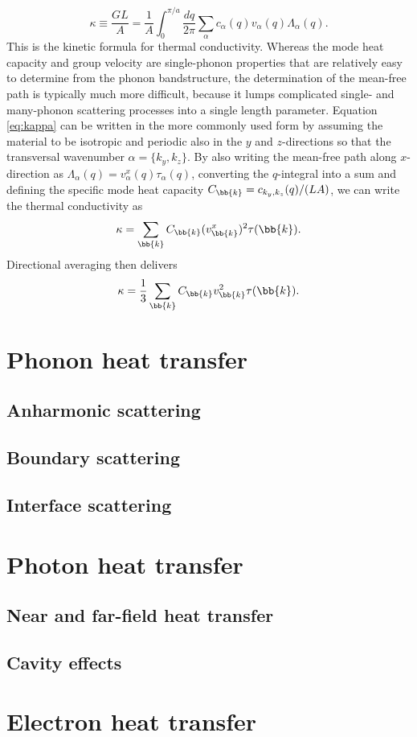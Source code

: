 \begin{equation}
 \kappa \equiv \frac{GL}{A} = \frac{1}{A} \int_0^{\pi/a} \frac{dq}{2\pi} \sum_{\alpha} c_{\alpha}(q) v_{\alpha}(q) \Lambda_{\alpha}(q). \label{eq:kappa}
\end{equation}
This is the kinetic formula for thermal conductivity. Whereas the mode heat capacity and group velocity are single-phonon properties that are relatively easy to determine from the phonon bandstructure, the determination of the mean-free path is typically much more difficult, because it lumps complicated single- and many-phonon scattering processes into a single length parameter. Equation \eqref{eq:kappa} can be written in the more commonly used form by assuming the material to be isotropic and periodic also in the $y$ and $z$-directions so that the transversal wavenumber $\alpha=\{k_y,k_z\}$. By also writing the mean-free path along $x$-direction as $\Lambda_{\alpha}(q)=v^x_{\alpha}(q) \tau_{\alpha}(q)$, converting the $q$-integral into a sum and defining the specific mode heat capacity $C_{\bb{k}}=c_{k_y,k_z}(q)/(LA)$, we can write the thermal conductivity as
\begin{equation}
 \kappa =  \sum_{\bb{k}} C_{\bb{k}} (v^x_{\bb{k}})^2 \tau(\bb{k}) .
\end{equation}
Directional averaging then delivers 
\begin{equation}
 \kappa =  \frac{1}{3} \sum_{\bb{k}} C_{\bb{k}} v_{\bb{k}}^2 \tau(\bb{k}).
\end{equation}



\section{Phonon heat transfer}

\subsection{Anharmonic scattering}

\subsection{Boundary scattering}

\subsection{Interface scattering}



\section{Photon heat transfer}

\subsection{Near and far-field heat transfer}

\subsection{Cavity effects}

\section{Electron heat transfer}

